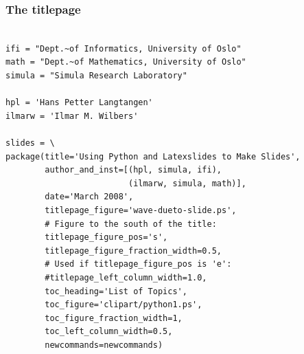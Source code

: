 \documentclass{beamer}
\begin{document}
\begin{frame}[fragile]
\frametitle{The titlepage}

\begin{block}

\begin{Verbatim}[fontsize=\footnotesize,tabsize=4,baselinestretch=0.85,fontfamily=tt,xleftmargin=7mm]

ifi = "Dept.~of Informatics, University of Oslo"
math = "Dept.~of Mathematics, University of Oslo"
simula = "Simula Research Laboratory"

hpl = 'Hans Petter Langtangen'
ilmarw = 'Ilmar M. Wilbers'

slides = \
package(title='Using Python and Latexslides to Make Slides',
        author_and_inst=[(hpl, simula, ifi),
                         (ilmarw, simula, math)],
        date='March 2008',
        titlepage_figure='wave-dueto-slide.ps',
        # Figure to the south of the title:
        titlepage_figure_pos='s',  
        titlepage_figure_fraction_width=0.5,
        # Used if titlepage_figure_pos is 'e':
        #titlepage_left_column_width=1.0,  
        toc_heading='List of Topics',
        toc_figure='clipart/python1.ps',
        toc_figure_fraction_width=1,
        toc_left_column_width=0.5,
        newcommands=newcommands)
\end{Verbatim}


\end{block}

\end{frame}
\end{document}
